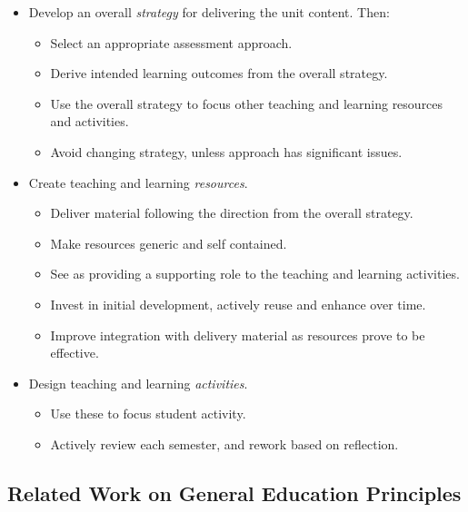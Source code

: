 \begin{itemize}[noitemsep,nolistsep]
	\item Develop an overall \emph{strategy} for delivering the unit content. Then:
	\begin{itemize}[noitemsep,nolistsep]
		\item Select an appropriate assessment approach.
		\item Derive intended learning outcomes from the overall strategy.
		\item Use the overall strategy to focus other teaching and learning resources and activities.
		\item Avoid changing strategy, unless approach has significant issues.
	\end{itemize}

	\item Create teaching and learning \emph{resources}.
	\begin{itemize}[noitemsep,nolistsep]
		\item Deliver material following the direction from the overall strategy.
		\item Make resources generic and self contained.
		\item See as providing a supporting role to the teaching and learning activities.
		\item Invest in initial development, actively reuse and enhance over time.
		\item Improve integration with delivery material as resources prove to be effective.
	\end{itemize}

	\item Design teaching and learning \emph{activities}.
	\begin{itemize}[noitemsep,nolistsep]
		\item Use these to focus student activity.
		\item Actively review each semester, and rework based on reflection.
	\end{itemize}
\end{itemize} 



\subsection{Related Work on General Education Principles} %
\label{ssub:related_work_on_education_principles}

